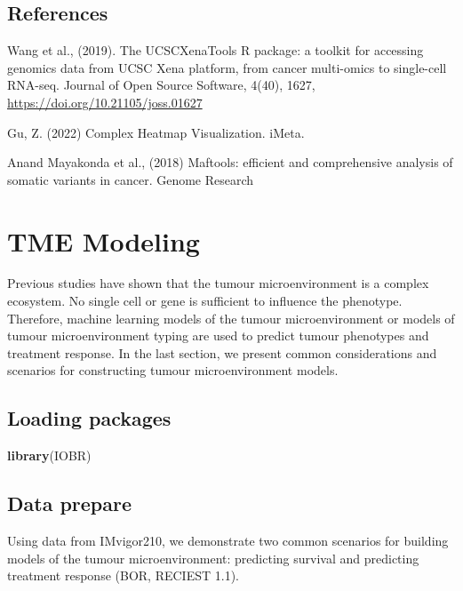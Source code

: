 \documentclass[
  12pt,
]{book}
\newenvironment{Shaded}{\begin{snugshade}}{\end{snugshade}}
\newcommand{\FunctionTok}[1]{\textcolor[rgb]{0.13,0.29,0.53}{\textbf{#1}}}
\newcommand{\NormalTok}[1]{#1}
\begin{document}
\hypertarget{references-5}{%
\section{References}\label{references-5}}

Wang et al., (2019). The UCSCXenaTools R package: a toolkit for accessing genomics data from UCSC Xena platform, from cancer multi-omics to single-cell RNA-seq. Journal of Open Source Software, 4(40), 1627, \url{https://doi.org/10.21105/joss.01627}

Gu, Z. (2022) Complex Heatmap Visualization. iMeta.

Anand Mayakonda et al., (2018) Maftools: efficient and comprehensive analysis of somatic variants in cancer. Genome Research

\hypertarget{tme-modeling}{%
\chapter{\texorpdfstring{\textbf{TME Modeling}}{TME Modeling}}\label{tme-modeling}}

Previous studies have shown that the tumour microenvironment is a complex ecosystem. No single cell or gene is sufficient to influence the phenotype. Therefore, machine learning models of the tumour microenvironment or models of tumour microenvironment typing are used to predict tumour phenotypes and treatment response. In the last section, we present common considerations and scenarios for constructing tumour microenvironment models.

\hypertarget{loading-packages-7}{%
\section{Loading packages}\label{loading-packages-7}}

\begin{Shaded}
\begin{Highlighting}[]
\FunctionTok{library}\NormalTok{(IOBR)}
\end{Highlighting}
\end{Shaded}

\hypertarget{data-prepare}{%
\section{Data prepare}\label{data-prepare}}

Using data from IMvigor210, we demonstrate two common scenarios for building models of the tumour microenvironment: predicting survival and predicting treatment response (BOR, RECIEST 1.1).
\end{document}

